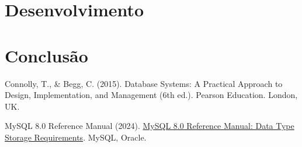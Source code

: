 \documentclass[a4paper,12pt]{scrreprt}
\begin{document}
\tableofcontents
\pagebreak

\listoffigures
\pagebreak

\listoftables
\pagebreak

\lstlistoflistings
\pagebreak





\chapter{Desenvolvimento}



\chapter{Conclusão}





\renewcommand\bibname{Referências}

\begin{thebibliography}{9}
Connolly, T., \& Begg, C. (2015). Database Systems: A Practical Approach to Design, Implementation, and Management (6th ed.). Pearson Education. London, UK.

MySQL 8.0 Reference Manual (2024). \href{https://dev.mysql.com/doc/refman/8.0/en/storage-requirements.html}{MySQL 8.0 Reference Manual: Data Type Storage Requirements}. MySQL, Oracle.
\end{thebibliography}
\end{document}
